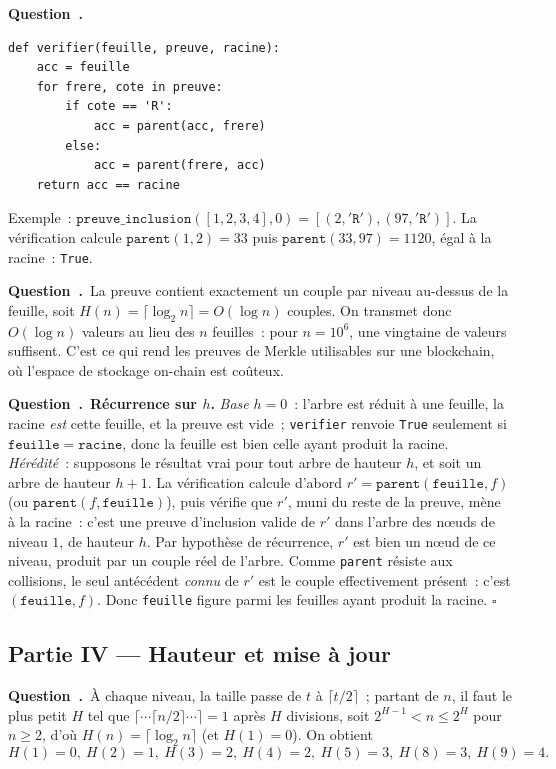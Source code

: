 \documentclass[11pt,a4paper]{article}
\newcounter{qcnt}
\newcommand{\Q}{\medskip\par\stepcounter{qcnt}\noindent\textbf{Question~\theqcnt.}~}
\newcommand{\code}[1]{\lstinline!#1!}
\begin{document}
\Q
\begin{lstlisting}
def verifier(feuille, preuve, racine):
    acc = feuille
    for frere, cote in preuve:
        if cote == 'R':
            acc = parent(acc, frere)
        else:
            acc = parent(frere, acc)
    return acc == racine
\end{lstlisting}
Exemple~: $\mathtt{preuve\_inclusion}([1,2,3,4],0)=[(2,\mathtt{'R'}),(97,\mathtt{'R'})]$. La
vérification calcule $\mathtt{parent}(1,2)=33$ puis $\mathtt{parent}(33,97)=1120$, égal à la
racine~: \code{True}.

\Q La preuve contient exactement un couple par niveau au-dessus de la feuille, soit $H(n)=
\lceil\log_2 n\rceil = O(\log n)$ couples. On transmet donc $O(\log n)$ valeurs au lieu des $n$
feuilles~: pour $n=10^{6}$, une vingtaine de valeurs suffisent. C'est ce qui rend les preuves de
Merkle utilisables sur une blockchain, où l'espace de stockage on-chain est coûteux.

\Q \textbf{Récurrence sur $h$.} \emph{Base} $h=0$~: l'arbre est réduit à une feuille, la racine
\emph{est} cette feuille, et la preuve est vide~; \code{verifier} renvoie \code{True} seulement si
$\mathtt{feuille}=\mathtt{racine}$, donc la feuille est bien celle ayant produit la racine.
\emph{Hérédité}~: supposons le résultat vrai pour tout arbre de hauteur $h$, et soit un arbre de
hauteur $h+1$. La vérification calcule d'abord $r' = \mathtt{parent}(\mathtt{feuille},f)$ (ou
$\mathtt{parent}(f,\mathtt{feuille})$), puis vérifie que $r'$, muni du reste de la preuve, mène à
la racine~: c'est une preuve d'inclusion valide de $r'$ dans l'arbre des n\oe uds de niveau $1$,
de hauteur $h$. Par hypothèse de récurrence, $r'$ est bien un n\oe ud de ce niveau, produit par
un couple réel de l'arbre. Comme \code{parent} résiste aux collisions, le seul antécédent
\emph{connu} de $r'$ est le couple effectivement présent~: c'est $(\mathtt{feuille},f)$. Donc
\code{feuille} figure parmi les feuilles ayant produit la racine. $\square$

\subsection*{Partie IV --- Hauteur et mise à jour}

\Q À chaque niveau, la taille passe de $t$ à $\lceil t/2\rceil$~; partant de $n$, il faut le plus
petit $H$ tel que $\lceil\cdots\lceil n/2\rceil\cdots\rceil = 1$ après $H$ divisions, soit
$2^{H-1} < n \le 2^{H}$ pour $n \ge 2$, d'où $H(n)=\lceil\log_2 n\rceil$ (et $H(1)=0$). On obtient
$$H(1)=0,\ H(2)=1,\ H(3)=2,\ H(4)=2,\ H(5)=3,\ H(8)=3,\ H(9)=4.$$
\end{document}
